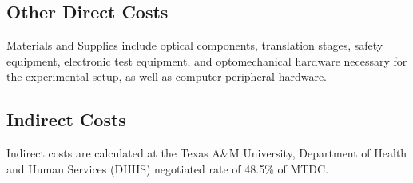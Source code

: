 \subsection{Other Direct Costs}
Materials and Supplies include optical components, translation stages, safety equipment, electronic test equipment, 
and optomechanical hardware necessary for the experimental setup, as well as computer peripheral hardware.

\subsection{Indirect Costs}
Indirect costs are calculated at the Texas A\&M University, Department of Health and Human Services (DHHS) 
negotiated rate of 48.5\% of MTDC.